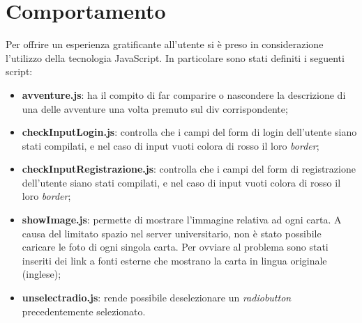 \section{Comportamento}
Per offrire un esperienza gratificante all'utente si è preso in considerazione l'utilizzo della tecnologia JavaScript. In particolare sono stati definiti i seguenti script:\\
\begin{itemize}

	\item \textbf{avventure.js}: ha il compito di far comparire o nascondere la descrizione di una delle avventure una volta premuto sul div corrispondente;
	\item \textbf{checkInputLogin.js}: controlla che i campi del form di login dell'utente siano stati compilati, e nel caso di input vuoti colora di rosso il loro \textit{border};
	\item \textbf{checkInputRegistrazione.js}: controlla che i campi del form di registrazione dell'utente siano stati compilati, e nel caso di input vuoti colora di rosso il loro \textit{border};
	\item \textbf{showImage.js}: permette di mostrare l'immagine relativa ad ogni carta.  A causa del limitato spazio nel server universitario, non è stato possibile caricare le foto di ogni singola carta. Per ovviare al problema sono stati inseriti dei link a fonti esterne che mostrano la carta in lingua originale (inglese);
	\item \textbf{unselectradio.js}: rende possibile deselezionare un \textit{radiobutton} precedentemente selezionato.
\end{itemize}


\newpage